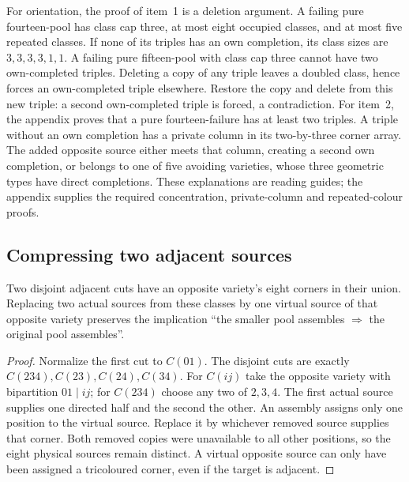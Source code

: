 For orientation, the proof of item~1 is a deletion argument. A failing
pure fourteen-pool has class cap three, at most eight occupied classes,
and at most five repeated classes. If none of its triples has an own
completion, its class sizes are $3,3,3,3,1,1$. A failing pure fifteen-pool
with class cap three cannot have two own-completed triples. Deleting a
copy of any triple leaves a doubled class, hence forces an own-completed
triple elsewhere. Restore the copy and delete from this new triple:
a second own-completed triple is forced, a contradiction.
For item~2, the appendix proves that a pure fourteen-failure has at least
two triples. A triple without an own completion has a private column in
its two-by-three corner array. The added opposite source either meets
that column, creating a second own completion, or belongs to one of five
avoiding varieties, whose three geometric types have direct completions.
These explanations are reading guides; the appendix supplies the required
concentration, private-column and repeated-colour proofs.

\subsection{Compressing two adjacent sources}
\begin{lemma}\label{lem:compression}
Two disjoint adjacent cuts have an opposite variety's eight corners in
their union. Replacing two actual sources from these classes by one
virtual source of that opposite variety preserves the implication
``the smaller pool assembles $\Rightarrow$ the original pool assembles''.
\end{lemma}
\begin{proof}
Normalize the first cut to $C(01)$. The disjoint cuts are exactly
$C(234),C(23),C(24),C(34)$. For $C(ij)$ take the opposite variety
with bipartition $01\mid ij$; for $C(234)$ choose any two of $2,3,4$.
The first actual source supplies one directed half and the second the
other. An assembly assigns only one position to the virtual source.
Replace it by whichever removed source supplies that corner. Both removed
copies were unavailable to all other positions, so the eight physical
sources remain distinct. A virtual opposite source can only have been
assigned a tricoloured corner, even if the target is adjacent.
\end{proof}

